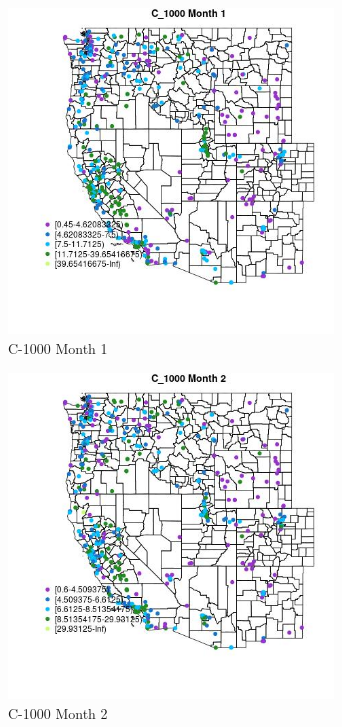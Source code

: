 \begin{figure} 
\centering  
\includegraphics[width=0.77\textwidth]{Code_Outputs/ML_input_report_ML_input_PM25_Step5_part_d_de_duplicated_aves_ML_input_MapObsMo1C_1000.jpg} 
\caption{\label{fig:ML_input_report_ML_input_PM25_Step5_part_d_de_duplicated_aves_ML_inputMapObsMo1C_1000}C-1000 Month 1} 
\end{figure} 
 

\begin{figure} 
\centering  
\includegraphics[width=0.77\textwidth]{Code_Outputs/ML_input_report_ML_input_PM25_Step5_part_d_de_duplicated_aves_ML_input_MapObsMo2C_1000.jpg} 
\caption{\label{fig:ML_input_report_ML_input_PM25_Step5_part_d_de_duplicated_aves_ML_inputMapObsMo2C_1000}C-1000 Month 2} 
\end{figure} 
 


